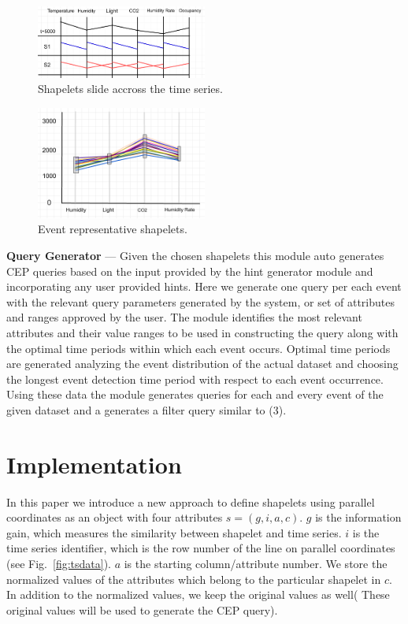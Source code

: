 \documentclass[conference]{IEEEtran}  %
\begin{document}
\begin{figure}
\includegraphics[width=0.5\textwidth]{movingWindow.png}
\caption{Shapelets slide accross the time series.}
\label{fig:tsshapes}
\end{figure}

\begin{figure}
\includegraphics[width=0.5\textwidth]{demo.png}
\caption{Event representative shapelets.}
\label{fig:tswin}
\end{figure}

\textbf{Query Generator} --- Given the chosen shapelets this module auto generates CEP queries based on the input provided by the hint generator module and incorporating any user provided hints. Here we generate one query per each event with the relevant query parameters generated by the system, or set of attributes and ranges approved by the user. The module identifies the most relevant attributes and their value ranges to be used in constructing the query along with the optimal time periods within which each event occurs. Optimal time periods are generated analyzing the event distribution of the actual dataset and choosing the longest event detection time period with respect to each event occurrence. Using these data the module generates queries for each and every event of the given dataset and a generates a filter query similar to (3).

\section{Implementation}
In this paper we introduce a new approach to define shapelets using parallel coordinates as an object with four attributes ${s = (g,i,a,c)}$. $g$ is the information gain, which measures the similarity between shapelet and time series. $i$ is the time series identifier, which is the row number of the line on parallel coordinates (see Fig.~\ref{fig:tsdata}). $a$ is the starting column/attribute number. We store the normalized values of the attributes which belong to the particular shapelet in $c$. In addition to the normalized values, we keep the original values as well( These original values will be used to generate the CEP query).
\end{document}
